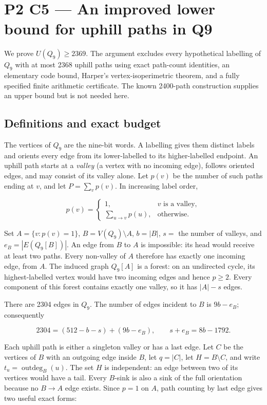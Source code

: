 \documentclass[11pt,a4paper]{article}
\begin{document}
\section{P2 C5 --- An improved lower bound for uphill paths in Q9}\label{p2-c5-an-improved-lower-bound-for-uphill-paths-in-q9}

We prove \textbf{\(U(Q_9)\ge2369\)}. The argument excludes every hypothetical labelling of \(Q_9\) with at most 2368 uphill paths using exact path-count identities, an elementary code bound, Harper's vertex-isoperimetric theorem, and a fully specified finite arithmetic certificate. The known 2400-path construction supplies an upper bound but is not needed here.

\subsection{Definitions and exact budget}\label{definitions-and-exact-budget}

The vertices of \(Q_9\) are the nine-bit words. A labelling gives them distinct labels and orients every edge from its lower-labelled to its higher-labelled endpoint. An uphill path starts at a \emph{valley} (a vertex with no incoming edge), follows oriented edges, and may consist of its valley alone. Let \(p(v)\) be the number of such paths ending at \(v\), and let \(P=\sum_v p(v)\). In increasing label order,

\[
p(v)=\begin{cases}1,&v\text{ is a valley},\\
\sum_{u\to v}p(u),&\text{otherwise}.
\end{cases}
\]

Set \(A=\{v:p(v)=1\}\), \(B=V(Q_9)\setminus A\), \(b=|B|\), \(s=\) the number of valleys, and \(e_B=|E(Q_9[B])|\). An edge from \(B\) to \(A\) is impossible: its head would receive at least two paths. Every non-valley of \(A\) therefore has exactly one incoming edge, from \(A\). The induced graph \(Q_9[A]\) is a forest: on an undirected cycle, its highest-labelled vertex would have two incoming edges and hence \(p\ge2\). Every component of this forest contains exactly one valley, so it has \(|A|-s\) edges.

There are 2304 edges in \(Q_9\). The number of edges incident to \(B\) is \(9b-e_B\); consequently

\[
2304=(512-b-s)+(9b-e_B),\qquad s+e_B=8b-1792. \tag{1}
\]

Each uphill path is either a singleton valley or has a last edge. Let \(C\) be the vertices of \(B\) with an outgoing edge inside \(B\), let \(q=|C|\), let \(H=B\setminus C\), and write \(t_u=\operatorname{outdeg}_{B}(u)\). The set \(H\) is independent: an edge between two of its vertices would have a tail. Every \(B\)-sink is also a sink of the full orientation because no \(B\to A\) edge exists. Since \(p=1\) on \(A\), path counting by last edge gives two useful exact forms:
\end{document}
